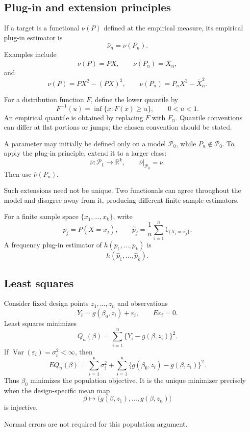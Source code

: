 \subsection{Plug-in and extension principles}

If a target is a functional $\nu(P)$ defined at the empirical
measure, its empirical plug-in estimator is
\[
\widehat\nu_n=\nu(P_n).
\]
Examples include
\[
\nu(P)=PX,
\qquad
\nu(P_n)=\overline X_n,
\]
and
\[
\nu(P)=PX^2-(PX)^2,
\qquad
\nu(P_n)=P_nX^2-\overline X_n^2.
\]

For a distribution function $F$, define the lower quantile by
\[
F^{-1}(u)=\inf\{x:F(x)\geq u\},
\qquad 0<u<1.
\]
An empirical quantile is obtained by replacing $F$ with $F_n$.
Quantile conventions can differ at flat portions or jumps; the
chosen convention should be stated.

A parameter may initially be defined only on a model
$\mathcal P_0$, while $P_n\notin\mathcal P_0$. To apply the plug-in
principle, extend it to a larger class:
\[
\overline\nu:\mathcal P_1\to\mathbb R^k,
\qquad
\overline\nu|_{\mathcal P_0}=\nu.
\]
Then use $\overline\nu(P_n)$.

Such extensions need not be unique. Two functionals can agree
throughout the model and disagree away from it, producing different
finite-sample estimators.

For a finite sample space $\{x_1,\ldots,x_k\}$, write
\[
p_j=P(X=x_j),
\qquad
\widehat p_j=\frac1n\sum_{i=1}^n1_{\{X_i=x_j\}}.
\]
A frequency plug-in estimator of $h(p_1,\ldots,p_k)$ is
\[
h(\widehat p_1,\ldots,\widehat p_k).
\]

\subsection{Least squares}

Consider fixed design points $z_1,\ldots,z_n$ and observations
\[
Y_i=g(\beta_0,z_i)+\varepsilon_i,
\qquad E\varepsilon_i=0.
\]
Least squares minimizes
\[
Q_n(\beta)=\sum_{i=1}^n
\{Y_i-g(\beta,z_i)\}^2.
\]
If $\operatorname{Var}(\varepsilon_i)=\sigma_i^2<\infty$, then
\[
EQ_n(\beta)
=
\sum_{i=1}^n\sigma_i^2
+
\sum_{i=1}^n
\{g(\beta_0,z_i)-g(\beta,z_i)\}^2.
\]
Thus $\beta_0$ minimizes the population objective. It is the unique
minimizer precisely when the design-specific mean map
\[
\beta\longmapsto
\bigl(g(\beta,z_1),\ldots,g(\beta,z_n)\bigr)
\]
is injective.

Normal errors are not required for this population argument.

